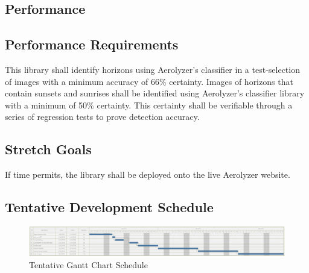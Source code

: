 \documentclass[journal,10pt,draftclsnofoot,onecolumn]{IEEEtran}
\begin{document}
\begin{singlespace}
\section{Performance}
	\subsection{Performance Requirements}
		This library shall identify horizons using Aerolyzer's classifier in a test-selection of images with a minimum accuracy of 66\% certainty.
		Images of horizons that contain sunsets and sunrises shall be identified using Aerolyzer's classifier library with a minimum of 50\% certainty.
		This certainty shall be verifiable through a series of regression tests to prove detection accuracy.

	\subsection{Stretch Goals}
		If time permits, the library shall be deployed onto the live Aerolyzer website.

	\begin{landscape}
		\subsection{Tentative Development Schedule}
		\begin{figure}[h]
			\includegraphics[width=9.5in]{gantt.png}
			\caption{Tentative Gantt Chart Schedule}
		    \label{fig:Tentative Schedule}
	    \end{figure}
	\end{landscape}

\end{singlespace}
\end{document}

